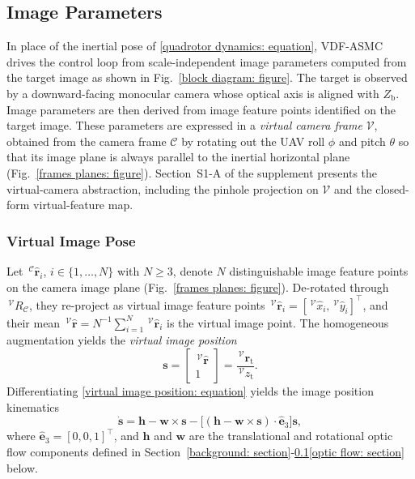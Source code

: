 \subsection{Image Parameters} \label{image parameters: section}
In place of the inertial pose of \eqref{quadrotor dynamics: equation}, VDF-ASMC drives the control loop from scale-independent image parameters computed from the target image as shown in Fig.~\ref{block diagram: figure}. The target is observed by a downward-facing monocular camera whose optical axis is aligned with $Z_\text{b}$. Image parameters are then derived from image feature points identified on the target image. These parameters are expressed in a \emph{virtual camera frame} $\mathcal{V}$, obtained from the camera frame $\mathcal{C}$ by rotating out the UAV roll $\phi$ and pitch $\theta$ so that its image plane is always parallel to the inertial horizontal plane (Fig.~\ref{frames planes: figure}). Section~S1-A of the supplement presents the virtual-camera abstraction, including the pinhole projection on $\mathcal{V}$ and the closed-form virtual-feature map.

\subsubsection{Virtual Image Pose} \label{virtual image pose: section}
Let $\,^\mathcal{C}\hat{\boldsymbol{r}}_i$, $i\in\{1,\dots,N\}$ with $N\ge 3$, denote $N$ distinguishable image feature points on the camera image plane (Fig.~\ref{frames planes: figure}). De-rotated through $\,^\mathcal{V}R_\mathcal{C}$, they re-project as virtual image feature points $\,^\mathcal{V}\hat{\boldsymbol{r}}_i=[\,^\mathcal{V}\hat{x}_i,\,^\mathcal{V}\hat{y}_i]^\top$, and their mean $\,^\mathcal{V}\hat{\boldsymbol{r}}=N^{-1}\sum_{i=1}^{N}\,^\mathcal{V}\hat{\boldsymbol{r}}_i$ is the virtual image point. The homogeneous augmentation yields the \emph{virtual image position}
\begin{equation} \label{virtual image position: equation}
    \boldsymbol{s} = \begin{bmatrix}\,^\mathcal{V}\hat{\boldsymbol{r}}\\ 1\end{bmatrix} = \frac{\,^\mathcal{V}\boldsymbol{r}_\text{t}}{\,^\mathcal{V}z_\text{t}}.
\end{equation}
Differentiating \eqref{virtual image position: equation} yields the image position kinematics
\begin{equation} \label{s dot: equation}
    \dot{\boldsymbol{s}} = \boldsymbol{h} - \boldsymbol{w}\times\boldsymbol{s} - \big[(\boldsymbol{h}-\boldsymbol{w}\times\boldsymbol{s})\cdot\hat{\boldsymbol{e}}_3\big]\boldsymbol{s},
\end{equation}
where $\hat{\boldsymbol{e}}_3=[0,0,1]^\top$, and $\boldsymbol{h}$ and $\boldsymbol{w}$ are the translational and rotational optic flow components defined in Section~\ref{background: section}-\ref{image parameters: section}\ref{optic flow: section} below.

